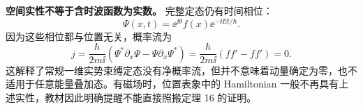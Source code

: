 \textbf{空间实性不等于含时波函数为实数。}
完整定态仍有时间相位：
\begin{equation}
  \Psi(x,t)=\ee^{\ii\theta}f(x)\ee^{-\ii Et/\hbar}.
\end{equation}
因为这些相位都与位置无关，概率流为
\begin{equation}
  j=\frac{\hbar}{2m\ii}
    \left(\Psi^*\partial_x\Psi-\Psi\partial_x\Psi^*\right)
   =\frac{\hbar}{2m\ii}(ff'-ff')=\boxed{0}.
\end{equation}
这解释了常规一维实势束缚定态没有净概率流，但并不意味着动量确定为零，也不适用于任意能量叠加态。有磁场时，位置表象中的 Hamiltonian 一般不再具有上述实性，教材因此明确提醒不能直接照搬定理 16 的证明。
